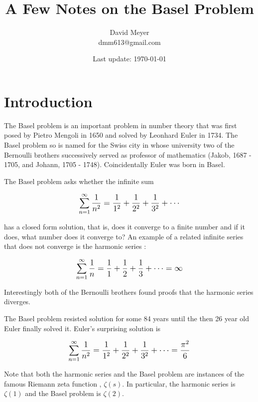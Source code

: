 \documentclass[11pt, oneside]{article}   	%
\title{A Few Notes on the Basel Problem}
\author{David Meyer \\ dmm613@gmail.com}
\date{Last update: \today}							%
\begin{document}
\maketitle

\section{Introduction}
The Basel problem \cite{wiki:basel} is an important problem in
number theory \cite{wiki:number_theory} that was first posed by
Pietro Mengoli in 1650 and solved by Leonhard Euler in 1734. The
Basel problem so is named for the Swiss city in whose university
two of the Bernoulli brothers successively served as professor of
mathematics (Jakob, 1687 - 1705, and Johann, 1705 - 1748).
Coincidentally Euler was born in Basel.

\bigskip
\noindent
The Basel problem asks whether the infinite sum

\begin{equation*}
\mathlarger{\sum\limits_{n = 1}^{\infty} \frac{1}{n^2} = \frac{1}{1^2}  + \frac{1}{2^2} + \frac{1}{3^2} + \cdots}
\end{equation*}

\bigskip
\noindent
has a closed form solution, that is, does it converge to a finite
number and if it does, what number does it converge to?  An
example of a related infinite series that does not converge is
the harmonic series \cite{wiki:harmonic}:

\begin{equation*}
\mathlarger{\sum\limits_{n = 1}^{\infty} \frac{1}{n} = \frac{1}{1} + \frac{1}{2} + \frac{1}{3} + \cdots = \infty}
\end{equation*}

\bigskip
\noindent
Interestingly both of the Bernoulli brothers found proofs that
the harmonic series diverges.

\bigskip
\noindent
The Basel problem resisted solution for some 84 years until the
then 26 year old Euler finally solved it.  Euler's surprising
solution is

\begin{equation*}
\mathlarger{\sum\limits_{n = 1}^{\infty} \frac{1}{n^2} = 
\frac{1}{1^2}  + \frac{1}{2^2} + \frac{1}{3^2} + \cdots = \frac{\pi^2}{6}}
\end{equation*}


\bigskip
\noindent
Note that both the harmonic series and the Basel problem are
instances of the famous Riemann zeta function \cite{wiki:zeta},
$\zeta(s)$.  In particular, the harmonic series is $\zeta(1)$ and
the Basel problem is $\zeta(2)$.
\end{document}
